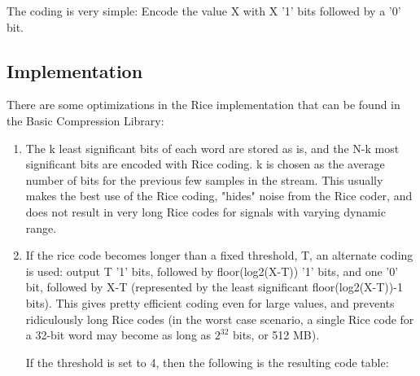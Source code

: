 \documentclass[a4paper,11pt,oneside]{report}
\begin{document}
The coding is very simple: Encode the value X with X '1' bits followed by
a '0' bit.

\subsection{Implementation}
There are some optimizations in the Rice implementation that can be
found in the Basic Compression Library:

\begin{enumerate}
\item The k least significant bits of each word are stored as is, and the
      N-k most significant bits are encoded with Rice coding. k is chosen as
      the average number of bits for the previous few samples in the stream.
      This usually makes the best use of the Rice coding, "hides" noise from
      the Rice coder, and does not result in very long Rice codes for signals
      with varying dynamic range.

\item If the rice code becomes longer than a fixed threshold, T, an
      alternate coding is used: output T '1' bits, followed by
      floor(log2(X-T)) '1' bits, and one '0' bit, followed by X-T (represented
      by the least significant floor(log2(X-T))-1  bits). This gives pretty
      efficient coding even for large values, and prevents ridiculously long
      Rice codes (in the worst case scenario, a single Rice code for a 32-bit
      word may become as long as $2^{32}$ bits, or 512 MB).

      If the threshold is set to 4, then the following is the resulting code
      table:


\end{enumerate}
\end{document}
